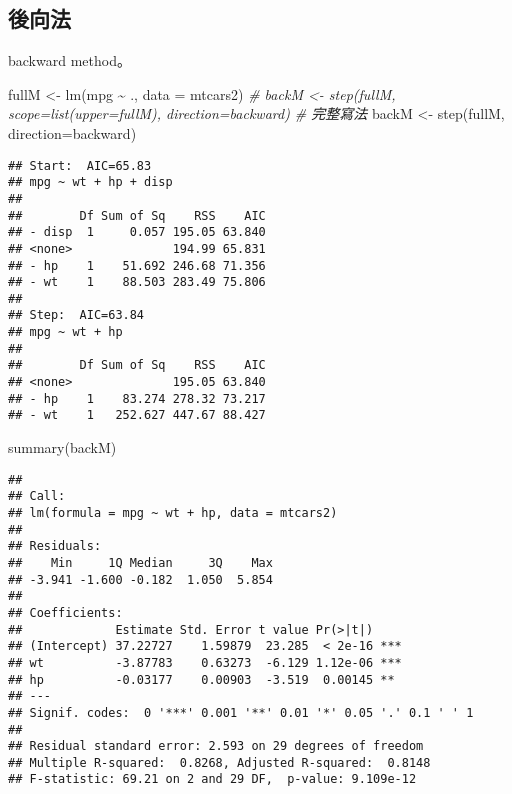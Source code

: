 \documentclass[
]{book}
\newenvironment{Shaded}{\begin{snugshade}}{\end{snugshade}}
\newcommand{\AttributeTok}[1]{\textcolor[rgb]{0.77,0.63,0.00}{#1}}
\newcommand{\CommentTok}[1]{\textcolor[rgb]{0.56,0.35,0.01}{\textit{#1}}}
\newcommand{\FunctionTok}[1]{\textcolor[rgb]{0.00,0.00,0.00}{#1}}
\newcommand{\NormalTok}[1]{#1}
\newcommand{\OtherTok}[1]{\textcolor[rgb]{0.56,0.35,0.01}{#1}}
\newcommand{\SpecialCharTok}[1]{\textcolor[rgb]{0.00,0.00,0.00}{#1}}
\newcommand{\StringTok}[1]{\textcolor[rgb]{0.31,0.60,0.02}{#1}}
\begin{document}
\hypertarget{ux5f8cux5411ux6cd5}{%
\subsection{後向法}\label{ux5f8cux5411ux6cd5}}

backward method。

\begin{Shaded}
\begin{Highlighting}[]
\NormalTok{fullM }\OtherTok{\textless{}{-}} \FunctionTok{lm}\NormalTok{(mpg }\SpecialCharTok{\textasciitilde{}}\NormalTok{ ., }\AttributeTok{data =}\NormalTok{ mtcars2)}
\CommentTok{\# backM \textless{}{-} step(fullM, scope=list(upper=fullM), direction=\textquotesingle{}backward\textquotesingle{}) \# 完整寫法}
\NormalTok{backM }\OtherTok{\textless{}{-}} \FunctionTok{step}\NormalTok{(fullM, }\AttributeTok{direction=}\StringTok{\textquotesingle{}backward\textquotesingle{}}\NormalTok{) }
\end{Highlighting}
\end{Shaded}

\begin{verbatim}
## Start:  AIC=65.83
## mpg ~ wt + hp + disp
## 
##        Df Sum of Sq    RSS    AIC
## - disp  1     0.057 195.05 63.840
## <none>              194.99 65.831
## - hp    1    51.692 246.68 71.356
## - wt    1    88.503 283.49 75.806
## 
## Step:  AIC=63.84
## mpg ~ wt + hp
## 
##        Df Sum of Sq    RSS    AIC
## <none>              195.05 63.840
## - hp    1    83.274 278.32 73.217
## - wt    1   252.627 447.67 88.427
\end{verbatim}

\begin{Shaded}
\begin{Highlighting}[]
\FunctionTok{summary}\NormalTok{(backM)}
\end{Highlighting}
\end{Shaded}

\begin{verbatim}
## 
## Call:
## lm(formula = mpg ~ wt + hp, data = mtcars2)
## 
## Residuals:
##    Min     1Q Median     3Q    Max 
## -3.941 -1.600 -0.182  1.050  5.854 
## 
## Coefficients:
##             Estimate Std. Error t value Pr(>|t|)    
## (Intercept) 37.22727    1.59879  23.285  < 2e-16 ***
## wt          -3.87783    0.63273  -6.129 1.12e-06 ***
## hp          -0.03177    0.00903  -3.519  0.00145 ** 
## ---
## Signif. codes:  0 '***' 0.001 '**' 0.01 '*' 0.05 '.' 0.1 ' ' 1
## 
## Residual standard error: 2.593 on 29 degrees of freedom
## Multiple R-squared:  0.8268, Adjusted R-squared:  0.8148 
## F-statistic: 69.21 on 2 and 29 DF,  p-value: 9.109e-12
\end{verbatim}
\end{document}
